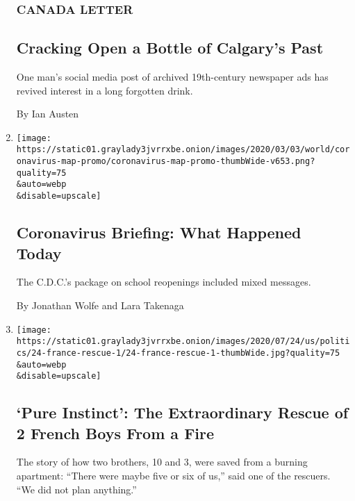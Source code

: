 \begin{enumerate}
  \hypertarget{canada-letter}{%
  \subsubsection{CANADA LETTER}\label{canada-letter}}

  \hypertarget{cracking-open-a-bottle-of-calgarys-past}{%
  \subsection{Cracking Open a Bottle of Calgary's
  Past}\label{cracking-open-a-bottle-of-calgarys-past}}

  One man's social media post of archived 19th-century newspaper ads has
  revived interest in a long forgotten drink.

  By Ian Austen
\item
  \href{/2020/07/24/us/24coronavirus-today.html}{}

  \texttt{[image: https://static01.graylady3jvrrxbe.onion/images/2020/03/03/world/coronavirus-map-promo/coronavirus-map-promo-thumbWide-v653.png?quality=75\\\&auto=webp\\\&disable=upscale]}

  \hypertarget{coronavirus-briefing-what-happened-today}{%
  \subsection{Coronavirus Briefing: What Happened
  Today}\label{coronavirus-briefing-what-happened-today}}

  The C.D.C.'s package on school reopenings included mixed messages.

  By Jonathan Wolfe and Lara Takenaga
\item
  \href{/2020/07/24/world/europe/grenoble-france-fire-rescue.html}{}

  \texttt{[image: https://static01.graylady3jvrrxbe.onion/images/2020/07/24/us/politics/24-france-rescue-1/24-france-rescue-1-thumbWide.jpg?quality=75\\\&auto=webp\\\&disable=upscale]}

  \hypertarget{pure-instinct-the-extraordinary-rescue-of-2-french-boys-from-a-fire}{%
  \subsection{`Pure Instinct': The Extraordinary Rescue of 2 French Boys
  From a
  Fire}\label{pure-instinct-the-extraordinary-rescue-of-2-french-boys-from-a-fire}}

  The story of how two brothers, 10 and 3, were saved from a burning
  apartment: ``There were maybe five or six of us,'' said one of the
  rescuers. ``We did not plan anything.''


\end{enumerate}
